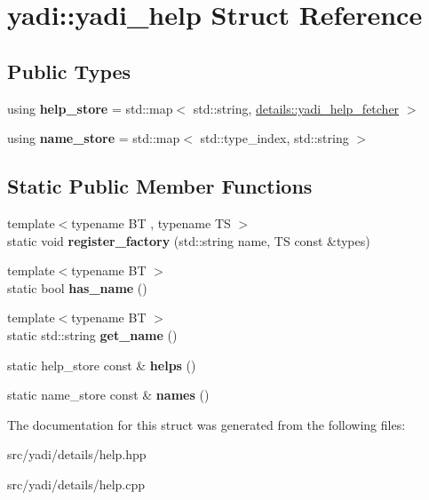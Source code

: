 \hypertarget{structyadi_1_1yadi__help}{}\section{yadi\+:\+:yadi\+\_\+help Struct Reference}
\label{structyadi_1_1yadi__help}
\subsection*{Public Types}
\begin{DoxyCompactItemize}
\item 
\mbox{\label{structyadi_1_1yadi__help_a3f208166dac982fc5ea2da59cccfd51e}} 
using {\bfseries help\+\_\+store} = std\+::map$<$ std\+::string, \hyperlink{structyadi_1_1details_1_1yadi__help__fetcher}{details\+::yadi\+\_\+help\+\_\+fetcher} $>$
\item 
\mbox{\label{structyadi_1_1yadi__help_aaa85b3a9116a8dd35a91db333576bf59}} 
using {\bfseries name\+\_\+store} = std\+::map$<$ std\+::type\+\_\+index, std\+::string $>$
\end{DoxyCompactItemize}
\subsection*{Static Public Member Functions}
\begin{DoxyCompactItemize}
\item 
\mbox{\label{structyadi_1_1yadi__help_add1c3496248cd02834c8bd835d4ac417}} 
{\footnotesize template$<$typename BT , typename TS $>$ }\\static void {\bfseries register\+\_\+factory} (std\+::string name, TS const \&types)
\item 
\mbox{\label{structyadi_1_1yadi__help_ade91b0fb56b72ee34c7e3be193faac02}} 
{\footnotesize template$<$typename BT $>$ }\\static bool {\bfseries has\+\_\+name} ()
\item 
\mbox{\label{structyadi_1_1yadi__help_a106e37c78f02730ba7d54f9892932ede}} 
{\footnotesize template$<$typename BT $>$ }\\static std\+::string {\bfseries get\+\_\+name} ()
\item 
\mbox{\label{structyadi_1_1yadi__help_a9ddef20988be744f132c45009a4c3810}} 
static help\+\_\+store const  \& {\bfseries helps} ()
\item 
\mbox{\label{structyadi_1_1yadi__help_a41fb4a566cae38f7530d1c9f08f72a8f}} 
static name\+\_\+store const  \& {\bfseries names} ()
\end{DoxyCompactItemize}


The documentation for this struct was generated from the following files\+:\begin{DoxyCompactItemize}
\item 
src/yadi/details/help.\+hpp\item 
src/yadi/details/help.\+cpp\end{DoxyCompactItemize}
